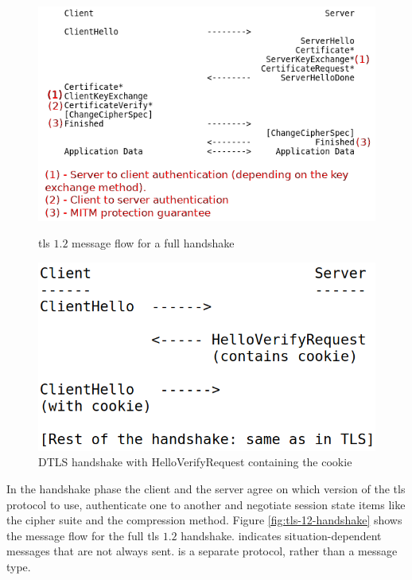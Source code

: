 \documentclass{llncs}
\begin{document}
{\begin{figure}
    \centering
    \begin{minipage}{0.6\textwidth}
        \centering
        \includegraphics[width=1.0\textwidth]{img/tls-12-full-handshake2.png} %
        \caption{\label{fig:tls-12-handshake} \gls{tls} $1.2$ message flow for a full handshake}
    \end{minipage}\hfill
    \begin{minipage}{0.4\textwidth}
        \centering
        \includegraphics[width=1.0\textwidth]{img/dtls-cookie.png} %
        \caption{\label{fig:dtls-cookie} DTLS handshake with HelloVerifyRequest containing the cookie}
    \end{minipage}
\end{figure}

In the handshake phase the client and the server agree on which version of the \gls{tls}
protocol to use, authenticate one to another and negotiate session state items like
the cipher suite and the compression method.  Figure \ref{fig:tls-12-handshake} shows the message flow for the
full \gls{tls} $1.2$ handshake. \codeword{*} indicates situation-dependent
messages that are not always sent.  is a separate
protocol, rather than a message type.

}
\end{document}
